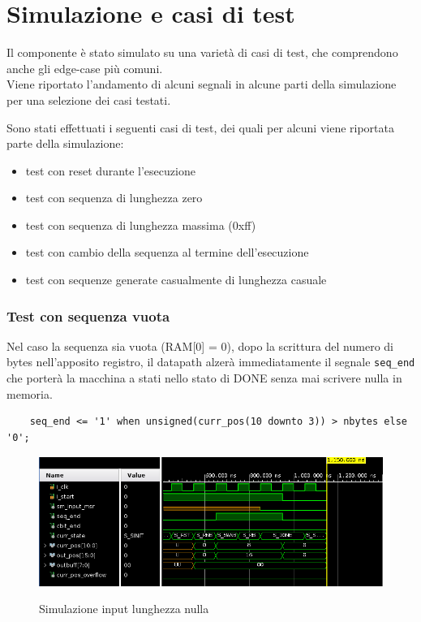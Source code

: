 \documentclass[12pt, a4paper]{article}
\begin{document}
\section{Simulazione e casi di test}

Il componente è stato simulato su una varietà di casi di test, che comprendono anche
gli edge-case più comuni.\\
Viene riportato l'andamento di alcuni segnali in alcune parti della simulazione per una selezione dei casi testati.

\noindent Sono stati effettuati i seguenti casi di test, dei quali per alcuni viene riportata parte della simulazione: %

\begin{itemize}[itemsep=4pt, topsep=4pt]
    \item test con reset durante l'esecuzione
    \item test con sequenza di lunghezza zero
    \item test con sequenza di lunghezza massima (0xff)
    \item test con cambio della sequenza al termine dell'esecuzione
    \item test con sequenze generate casualmente di lunghezza casuale
\end{itemize}

\subsubsection{Test con sequenza vuota}

Nel caso la sequenza sia vuota (RAM[0] = 0), dopo la scrittura del numero di bytes nell'apposito registro,
il datapath alzerà immediatamente il segnale \texttt{seq\_end} che porterà la macchina a stati
nello stato di DONE senza mai scrivere nulla in memoria.

\begin{verbatim}
    seq_end <= '1' when unsigned(curr_pos(10 downto 3)) > nbytes else '0';
\end{verbatim}

\begin{figure}[h!]
    \centering
    \includegraphics[scale=0.5]{sim_minlen_init.png}
    \label{img:sim_min_init}
    \caption{Simulazione input lunghezza nulla}
\end{figure}
\end{document}
